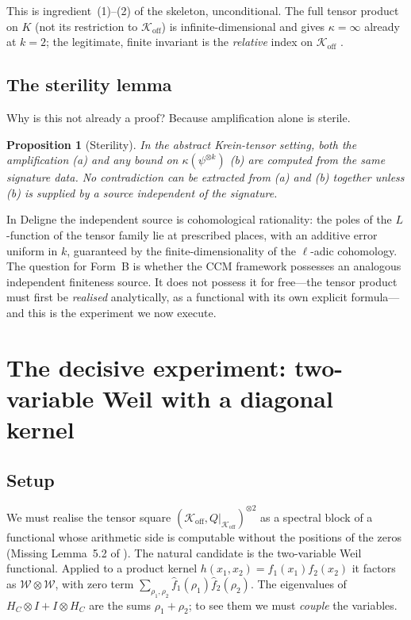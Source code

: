 \documentclass[11pt]{amsart}
\newtheorem{proposition}[theorem]{Proposition}
\theoremstyle{definition}
\theoremstyle{remark}
\newcommand{\Koff}{\mathcal{K}_{\mathrm{off}}}
\begin{document}
This is ingredient~(1)--(2) of the skeleton, unconditional. The full tensor
product on $K$ (not its restriction to $\Koff$) is infinite-dimensional and
gives $\kappa=\infty$ already at $k=2$; the legitimate, finite invariant is
the \emph{relative} index on $\Koff$ \cite[\S3]{P40}.

\subsection{The sterility lemma}
Why is this not already a proof? Because amplification alone is sterile.

\begin{proposition}[Sterility]\label{prop:sterility}
In the abstract Krein-tensor setting, both the amplification (a) and any
bound on $\kappa(\psi^{\otimes k})$ (b) are computed from the same signature
data. No contradiction can be extracted from (a) and (b) together unless (b)
is supplied by a source independent of the signature.
\end{proposition}

In Deligne the independent source is cohomological rationality: the poles of
the $L$-function of the tensor family lie at prescribed places, with an
additive error uniform in $k$, guaranteed by the finite-dimensionality of
the $\ell$-adic cohomology. The question for Form~B is whether the CCM
framework possesses an analogous independent finiteness source. It does not
possess it for free---the tensor product must first be \emph{realised}
analytically, as a functional with its own explicit formula---and this is
the experiment we now execute.

\section{The decisive experiment: two-variable Weil with a diagonal kernel}\label{sec:experiment}

\subsection{Setup}
We must realise the tensor square $(\Koff,Q|_{\Koff})^{\otimes2}$ as a
spectral block of a functional whose arithmetic side is computable without
the positions of the zeros (Missing Lemma~5.2 of \cite[]{P40}).
The natural candidate is the two-variable Weil functional. Applied to a
product kernel $h(x_1,x_2)=f_1(x_1)f_2(x_2)$ it factors as
$\mathcal{W}\otimes\mathcal{W}$, with zero term
$\sum_{\rho_1,\rho_2}\hat f_1(\rho_1)\hat f_2(\rho_2)$. The eigenvalues of
$H_C\otimes I+I\otimes H_C$ are the sums $\rho_1+\rho_2$; to see them we
must \emph{couple} the variables.
\end{document}
